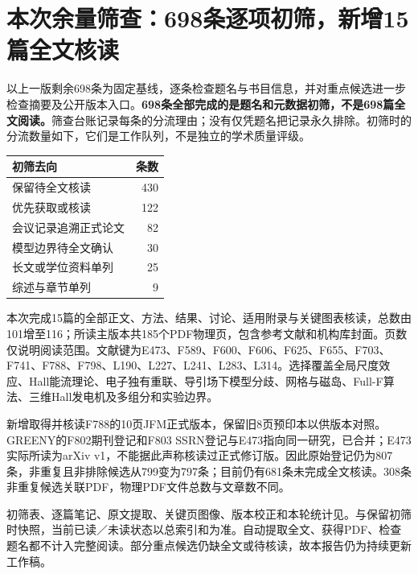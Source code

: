 \section{本次余量筛查：698条逐项初筛，新增15篇全文核读}
以上一版剩余698条为固定基线，逐条检查题名与书目信息，并对重点候选进一步检查摘要及公开版本入口。\textbf{698条全部完成的是题名和元数据初筛，不是698篇全文阅读。}筛查台账记录每条的分流理由；没有仅凭题名把记录永久排除。初筛时的分流数量如下，它们是工作队列，不是独立的学术质量评级。
\begin{center}\small
\begin{tabular}{lr}\toprule 初筛去向 & 条数\\\midrule
保留待全文核读 &430\\
优先获取或核读 &122\\
会议记录追溯正式论文 &82\\
模型边界待全文确认 &30\\
长文或学位资料单列 &25\\
综述与章节单列 &9\\\bottomrule
\end{tabular}
\end{center}
本次完成15篇的全部正文、方法、结果、讨论、适用附录与关键图表核读，总数由101增至116；所读主版本共185个PDF物理页，包含参考文献和机构库封面。页数仅说明阅读范围。文献键为E473、F589、F600、F606、F625、F655、F703、F741、F788、F798、L190、L227、L241、L283、L314。选择覆盖全局尺度效应、Hall能流理论、电子独有重联、导引场下模型分歧、网格与磁岛、Full-F算法、三维Hall发电机及多组分和实验边界。

新增取得并核读F788的10页JFM正式版本，保留旧8页预印本以供版本对照。GREENY的F802期刊登记和F803 SSRN登记与E473指向同一研究，已合并；E473实际所读为arXiv v1，不能据此声称核读过正式修订版。因此原始登记仍为807条，非重复且非排除候选从799变为797条；目前仍有681条未完成全文核读。308条非重复候选关联PDF，物理PDF文件总数与文章数不同。

初筛表、逐篇笔记、原文提取、关键页图像、版本校正和本轮统计见。与保留初筛时快照，当前已读／未读状态以总索引和为准。自动提取全文、获得PDF、检查题名都不计入完整阅读。部分重点候选仍缺全文或待核读，故本报告仍为持续更新工作稿。

